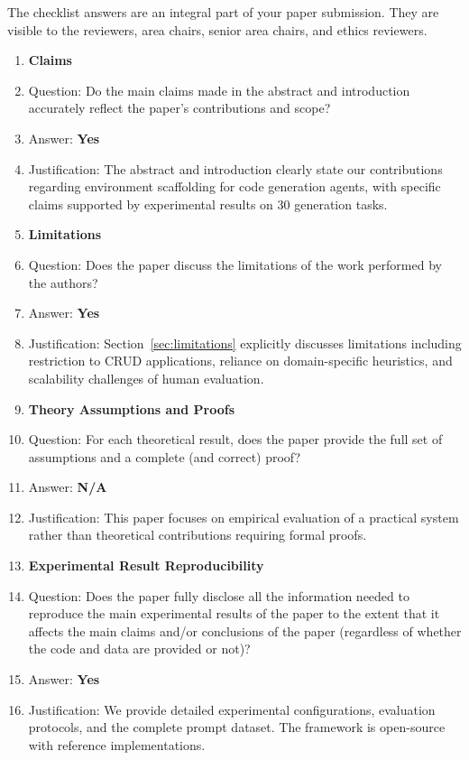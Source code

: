 \documentclass{article}
\begin{document}
The checklist answers are an integral part of your paper submission. They are visible to the reviewers, area chairs, senior area chairs, and ethics reviewers.

\begin{enumerate}

\item {\bf Claims}
    \item[] Question: Do the main claims made in the abstract and introduction accurately reflect the paper's contributions and scope?
    \item[] Answer: \textbf{Yes}
    \item[] Justification: The abstract and introduction clearly state our contributions regarding environment scaffolding for code generation agents, with specific claims supported by experimental results on 30 generation tasks.

\item {\bf Limitations}
    \item[] Question: Does the paper discuss the limitations of the work performed by the authors?
    \item[] Answer: \textbf{Yes}
    \item[] Justification: Section~\ref{sec:limitations} explicitly discusses limitations including restriction to CRUD applications, reliance on domain-specific heuristics, and scalability challenges of human evaluation.

\item {\bf Theory Assumptions and Proofs}
    \item[] Question: For each theoretical result, does the paper provide the full set of assumptions and a complete (and correct) proof?
    \item[] Answer: \textbf{N/A}
    \item[] Justification: This paper focuses on empirical evaluation of a practical system rather than theoretical contributions requiring formal proofs.

\item {\bf Experimental Result Reproducibility}
    \item[] Question: Does the paper fully disclose all the information needed to reproduce the main experimental results of the paper to the extent that it affects the main claims and/or conclusions of the paper (regardless of whether the code and data are provided or not)?
    \item[] Answer: \textbf{Yes}
    \item[] Justification: We provide detailed experimental configurations, evaluation protocols, and the complete prompt dataset. The framework is open-source with reference implementations.


\end{enumerate}
\end{document}
